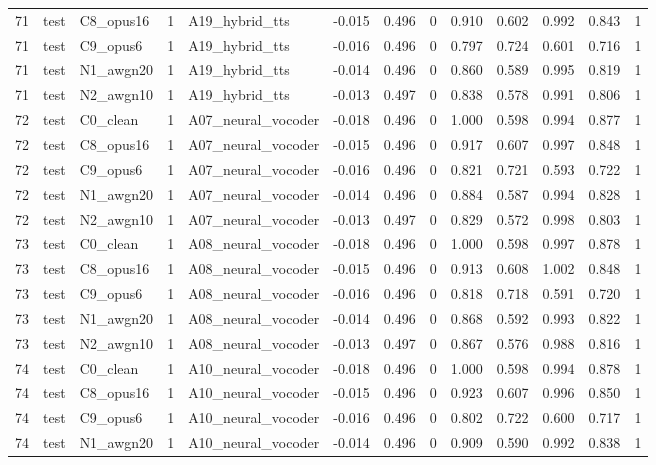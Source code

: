 \begin{tabular}{rllrlrrrrrrrr}
71 & test & C8_opus16 & 1 & A19_hybrid_tts & -0.015 & 0.496 & 0 & 0.910 & 0.602 & 0.992 & 0.843 & 1 \\
71 & test & C9_opus6 & 1 & A19_hybrid_tts & -0.016 & 0.496 & 0 & 0.797 & 0.724 & 0.601 & 0.716 & 1 \\
71 & test & N1_awgn20 & 1 & A19_hybrid_tts & -0.014 & 0.496 & 0 & 0.860 & 0.589 & 0.995 & 0.819 & 1 \\
71 & test & N2_awgn10 & 1 & A19_hybrid_tts & -0.013 & 0.497 & 0 & 0.838 & 0.578 & 0.991 & 0.806 & 1 \\
72 & test & C0_clean & 1 & A07_neural_vocoder & -0.018 & 0.496 & 0 & 1.000 & 0.598 & 0.994 & 0.877 & 1 \\
72 & test & C8_opus16 & 1 & A07_neural_vocoder & -0.015 & 0.496 & 0 & 0.917 & 0.607 & 0.997 & 0.848 & 1 \\
72 & test & C9_opus6 & 1 & A07_neural_vocoder & -0.016 & 0.496 & 0 & 0.821 & 0.721 & 0.593 & 0.722 & 1 \\
72 & test & N1_awgn20 & 1 & A07_neural_vocoder & -0.014 & 0.496 & 0 & 0.884 & 0.587 & 0.994 & 0.828 & 1 \\
72 & test & N2_awgn10 & 1 & A07_neural_vocoder & -0.013 & 0.497 & 0 & 0.829 & 0.572 & 0.998 & 0.803 & 1 \\
73 & test & C0_clean & 1 & A08_neural_vocoder & -0.018 & 0.496 & 0 & 1.000 & 0.598 & 0.997 & 0.878 & 1 \\
73 & test & C8_opus16 & 1 & A08_neural_vocoder & -0.015 & 0.496 & 0 & 0.913 & 0.608 & 1.002 & 0.848 & 1 \\
73 & test & C9_opus6 & 1 & A08_neural_vocoder & -0.016 & 0.496 & 0 & 0.818 & 0.718 & 0.591 & 0.720 & 1 \\
73 & test & N1_awgn20 & 1 & A08_neural_vocoder & -0.014 & 0.496 & 0 & 0.868 & 0.592 & 0.993 & 0.822 & 1 \\
73 & test & N2_awgn10 & 1 & A08_neural_vocoder & -0.013 & 0.497 & 0 & 0.867 & 0.576 & 0.988 & 0.816 & 1 \\
74 & test & C0_clean & 1 & A10_neural_vocoder & -0.018 & 0.496 & 0 & 1.000 & 0.598 & 0.994 & 0.878 & 1 \\
74 & test & C8_opus16 & 1 & A10_neural_vocoder & -0.015 & 0.496 & 0 & 0.923 & 0.607 & 0.996 & 0.850 & 1 \\
74 & test & C9_opus6 & 1 & A10_neural_vocoder & -0.016 & 0.496 & 0 & 0.802 & 0.722 & 0.600 & 0.717 & 1 \\
74 & test & N1_awgn20 & 1 & A10_neural_vocoder & -0.014 & 0.496 & 0 & 0.909 & 0.590 & 0.992 & 0.838 & 1 \\

\end{tabular}

